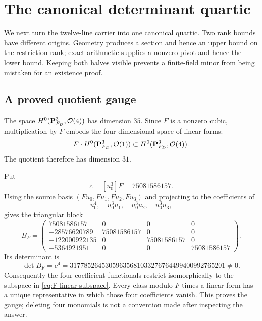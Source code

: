 \section{The canonical determinant quartic}
\label{sec:canonical-quartic}

We next turn the twelve-line carrier into one canonical quartic.  Two rank
bounds have different origins.  Geometry produces a section and hence an
upper bound on the restriction rank; exact arithmetic supplies a nonzero
pivot and hence the lower bound.  Keeping both halves visible prevents a
finite-field minor from being mistaken for an existence proof.

\subsection{A proved quotient gauge}

The space \(H^0(\mathbf P^3_{F_D},\mathcal O(4))\) has dimension \(35\).  Since
\(F\) is a nonzero cubic, multiplication by \(F\) embeds the four-dimensional
space of linear forms:
\begin{equation}
 F\cdot H^0(\mathbf P^3_{F_D},\mathcal O(1))
 \subset H^0(\mathbf P^3_{F_D},\mathcal O(4)).
\label{eq:F-linear-subspace}
\end{equation}
The quotient therefore has dimension \(31\).

Put
\[
 c=[u_0^3]F=75081586157.
\]
Using the source basis \((Fu_0,Fu_1,Fu_2,Fu_3)\) and projecting to the
coefficients of
\[
 u_0^4,\quad u_0^3u_1,\quad u_0^3u_2,\quad u_0^3u_3,
\]
gives the triangular block
\begin{equation}
 B_F=
 \begin{pmatrix}
 75081586157&0&0&0\\
 -28576620789&75081586157&0&0\\
 -122000922135&0&75081586157&0\\
 -5364921951&0&0&75081586157
 \end{pmatrix}.
\label{eq:gauge-block}
\end{equation}
Its determinant is
\begin{equation}
 \det B_F=c^4
 =31778526453059635681033276764499400992765201\ne0.
\label{eq:gauge-determinant}
\end{equation}
Consequently the four coefficient functionals restrict isomorphically to
the subspace in \cref{eq:F-linear-subspace}.  Every class modulo \(F\) times
a linear form has a unique representative in which those four coefficients
vanish.  This proves the gauge; deleting four monomials is not a convention
made after inspecting the answer.

